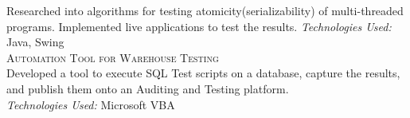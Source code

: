 \documentclass[letterpaper,12pt,final]{memoir}
\newcommand{\Sep}{\vspace{1.5em}}
\newcommand{\SmallSep}{\vspace{0.5em}}
\newcommand{\CVItem}[1]
	{\textsc{\color{Black} #1}}
\begin{document}
{\footnotesize Researched into algorithms for testing atomicity(serializability) of multi-threaded programs. Implemented live applications to test the results.
	\emph{Technologies Used:} Java, Swing}%
\SmallSep\\
\CVItem{Automation Tool for Warehouse Testing}\\
{\footnotesize Developed a tool to execute SQL Test scripts on a database, capture the results, and publish them onto an Auditing and Testing platform.\\ \emph{Technologies Used:} Microsoft VBA
}
\end{document}
